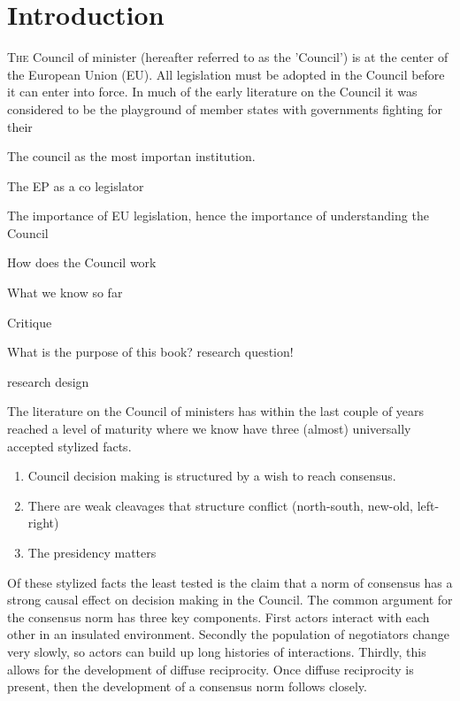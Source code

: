 \chapter{Introduction}
\lettrine[lines = 3]{T}{he} Council of minister (hereafter referred to as the 'Council') is at the center of the European Union (EU). All legislation must be adopted in the Council before it can enter into force. In much of the early literature on the Council it was considered to be the playground of member states with governments fighting for their 

The council as the most importan institution.

The EP as a co legislator

The importance of EU legislation, hence the importance of understanding the Council

How does the Council work

What we know so far

Critique

What is the purpose of this book? research question!

research design




The literature on the Council of ministers has within the last couple of years reached a level of maturity where we know have three (almost) universally accepted stylized facts.

\begin{enumerate}
\item Council decision making is structured by a wish to reach consensus.
\item There are weak cleavages that structure conflict (north-south, new-old, left-right)
\item The presidency matters
\end{enumerate}

Of these stylized facts the least tested is the claim that a norm of consensus has a strong causal effect on decision making in the Council. The common argument for the consensus norm has three key components. First actors interact with each other in an insulated environment. Secondly the population of negotiators change very slowly, so actors can build up long histories of interactions. Thirdly, this allows for the development of diffuse reciprocity. Once diffuse reciprocity is present, then the development of a consensus norm follows closely. 


